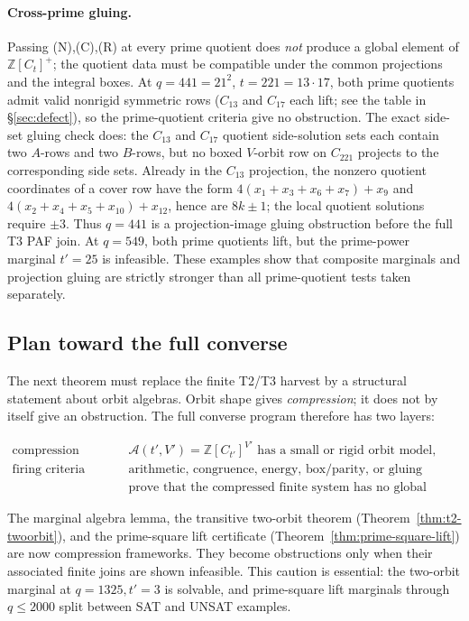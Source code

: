 \documentclass[11pt]{article}
\theoremstyle{plain}
\theoremstyle{definition}
\theoremstyle{remark}
\newcommand{\Z}{\mathbb Z}
\begin{document}
\paragraph{Cross-prime gluing.}\label{sec:gluing}
Passing (N),(C),(R) at every prime quotient does \emph{not} produce a global
element of $\Z[C_t]^+$; the quotient data must be compatible under the common
projections and the integral boxes.  At $q=441=21^2$,
$t=221=13\cdot17$, both prime quotients admit valid nonrigid symmetric rows
($C_{13}$ and $C_{17}$ each lift; see the table in \S\ref{sec:defect}), so the
prime-quotient criteria give no obstruction.  The exact side-set gluing check
does: the $C_{13}$ and $C_{17}$ quotient side-solution sets each contain two
$A$-rows and two $B$-rows, but no boxed $V$-orbit row on $C_{221}$ projects to
the corresponding side sets.  Already in the $C_{13}$ projection, the nonzero
quotient coordinates of a cover row have the form
$4(x_1+x_3+x_6+x_7)+x_9$ and $4(x_2+x_4+x_5+x_{10})+x_{12}$, hence are
$8k\pm1$; the local quotient solutions require $\pm3$.  Thus $q=441$ is a
projection-image gluing obstruction before the full T3 PAF join.  At $q=549$,
both prime quotients lift, but the prime-power marginal $t'=25$ is infeasible.
These examples show that composite marginals and projection gluing are
strictly stronger than all prime-quotient tests taken separately.

\subsection{Plan toward the full converse}\label{sec:full-converse-plan}

The next theorem must replace the finite T2/T3 harvest by a structural
statement about orbit algebras.  Orbit shape gives \emph{compression}; it does
not by itself give an obstruction.  The full converse program therefore has two
layers:

\[
\begin{array}{ll}
\text{compression families} &
  \mathcal A(t',V')=\Z[C_{t'}]^{V'}\text{ has a small or rigid orbit model},\\[2mm]
\text{firing criteria} &
  \text{arithmetic, congruence, energy, box/parity, or gluing arguments}\\
  &\text{prove that the compressed finite system has no global witness.}
\end{array}
\]

The marginal algebra lemma, the transitive two-orbit theorem
(Theorem~\ref{thm:t2-twoorbit}), and the prime-square lift certificate
(Theorem~\ref{thm:prime-square-lift}) are now compression frameworks. They
become obstructions only when their associated finite joins are shown
infeasible. This caution is essential: the two-orbit marginal at
$q=1325,t'=3$ is solvable, and prime-square lift marginals through $q\le2000$
split between SAT and UNSAT examples.
\end{document}
